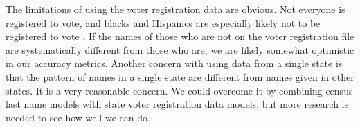 \documentclass[12pt, letterpaper]{article}
\begin{document}
The limitations of using the voter registration data are obvious. Not everyone is registered to vote, and blacks and Hispanics are especially likely not to be registered to vote \citep{ansolabehere2011gender}. If the names of those who are not on the voter registration file are systematically different from those who are, we are likely somewhat optimistic in our accuracy metrics. Another concern with using data from a single state is that the pattern of names in a single state are different from names given in other states. It is a very reasonable concern. We could overcome it by combining census last name models with state voter registration data models, but more research is needed to see how well we can do.

\clearpage


\clearpage
\end{document}
